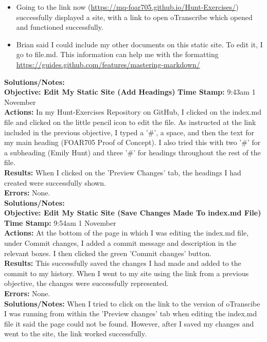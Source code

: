 \documentclass{article}
\begin{document}
\begin{FlushLeft}
\begin{itemize}
    \item Going to the link now (\url{https://mq-foar705.github.io/Hunt-Exercises/}) successfully displayed a site, with a link to open oTranscribe which opened and functioned successfully.
    \item Brian said I could include my other documents on this static site. To edit it, I go to file.md. This information can help me with the formatting \url{https://guides.github.com/features/mastering-markdown/}
\end{itemize}
\textbf{Solutions/Notes:}\\
\vspace{5mm}
\textbf{Objective: Edit My Static Site (Add Headings)} 
\textbf{Time Stamp:} 9:43am 1 November\\
\textbf{Actions:} In my Hunt-Exercises Repository on GitHub, I clicked on the index.md file and clicked on the little pencil icon to edit the file. As instructed at the link included in the previous objective, I typed a '\#', a space, and then the text for my main heading (FOAR705 Proof of Concept). I also tried this with two '\#' for a subheading (Emily Hunt) and three '\#' for headings throughout the rest of the file.\\
\textbf{Results:} When I clicked on the 'Preview Changes' tab, the headings I had created were successfully shown.\\
\textbf{Errors:} None.\\
\textbf{Solutions/Notes:}\\
\vspace{5mm}
\textbf{Objective: Edit My Static Site (Save Changes Made To index.md File)}\\ 
\textbf{Time Stamp:} 9:54am 1 November\\
\textbf{Actions:} At the bottom of the page in which I was editing the index.md file, under Commit changes, I added a commit message and description in the relevant boxes. I then clicked the green 'Commit changes' button. \\
\textbf{Results:} This successfully saved the changes I had made and added to the commit to my history. When I went to my site using the link from a previous objective, the changes were successfully represented. \\
\textbf{Errors:} None.\\
\textbf{Solutions/Notes:} When I tried to click on the link to the version of oTranscibe I was running from within the 'Preview changes' tab when editing the index.md file it said the page could not be found. However, after I saved my changes and went to the site, the link worked successfully.\\

\end{FlushLeft}
\end{document}

